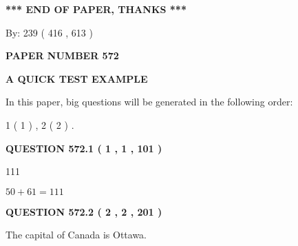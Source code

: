 \documentclass[12pt]{article}
\begin{document}
\vspace{1.0in} 
{\textbf{\large{ *** END OF PAPER, THANKS *** }}} 
   
   
\hspace{1.0in} By: 
 239 ( 416 ,  613 )
   
   
   
   
\newpage 
\setcounter{page}{ 
   572001 } 
   
   
   
   
 {\textbf{ \Large{ PAPER NUMBER  572  }}}
   
   
\vspace{0.2in}
   
   
   
   
   
   
 \vspace{0.2in}
{\LARGE {\textbf{ A QUICK TEST EXAMPLE}}}
   
   
   
\vspace{0.2in}
   
In this paper, big questions will be generated in the following order: 
   
   
   1 ( 1 )
 ,
   2 ( 2 )
 .
  
\vspace{0.2in}
  
{\textbf{\Large{QUESTION
572.1 
 ( 1 , 1 , 101 )
}}}
  
  
 
 
\noindent{}

111
 
 
 
 
\noindent{}

$ %
50 +  %
61=   %
111$
 
 
  
\vspace{0.2in}
  
{\textbf{\Large{QUESTION
572.2 
 ( 2 , 2 , 201 )
}}}
  
  
 
 
\noindent{}
 
 
The capital of Canada is Ottawa.
 
\end{document}
